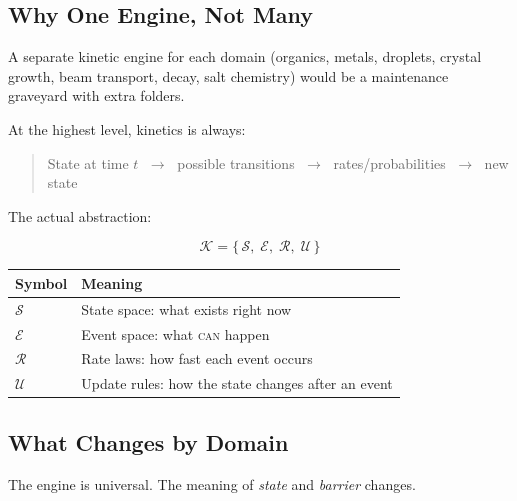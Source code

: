\documentclass[11pt]{article}
\begin{document}
\subsection{Why One Engine, Not Many}

A separate kinetic engine for each domain (organics, metals, droplets,
crystal growth, beam transport, decay, salt chemistry) would be a
maintenance graveyard with extra folders.

At the highest level, kinetics is always:

\begin{quote}
State at time $t$ $\;\to\;$ possible transitions $\;\to\;$
rates/probabilities $\;\to\;$ new state
\end{quote}

The actual abstraction:

\begin{equation}
\label{eq:kinetic_tuple}
\mathcal{K} = \{\,\mathcal{S},\; \mathcal{E},\; \mathcal{R},\; \mathcal{U}\,\}
\end{equation}

\begin{center}
\begin{tabular}{lp{9cm}}
\toprule
Symbol & Meaning \\
\midrule
$\mathcal{S}$ & State space: what exists right now \\
$\mathcal{E}$ & Event space: what \textsc{can} happen \\
$\mathcal{R}$ & Rate laws: how fast each event occurs \\
$\mathcal{U}$ & Update rules: how the state changes after an event \\
\bottomrule
\end{tabular}
\end{center}

\subsection{What Changes by Domain}

The engine is universal.  The meaning of \emph{state} and \emph{barrier}
changes.
\end{document}
